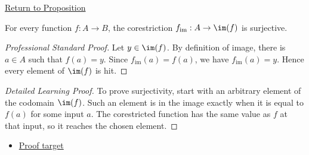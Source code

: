 \newpage
{}
\label{prf:corestriction-surjective}

\begin{remark*}[Return]
\hyperref[prop:corestriction-surjective]{Return to Proposition}
\end{remark*}

\begin{proposition*}
For every function $f:A\to B$, the corestriction
$f_{\operatorname{im}}:A\to\im(f)$ is surjective.
\end{proposition*}

\begin{proof}[Professional Standard Proof]
\LRAProofBodyStart
Let $y\in\im(f)$. By definition of image, there is $a\in A$ such that
$f(a)=y$. Since $f_{\operatorname{im}}(a)=f(a)$, we have
$f_{\operatorname{im}}(a)=y$. Hence every element of $\im(f)$ is hit.
\end{proof}

\begin{proof}[Detailed Learning Proof]
\LRAProofBodyStart
To prove surjectivity, start with an arbitrary element of the codomain
$\im(f)$. Such an element is in the image exactly when it is equal to $f(a)$
for some input $a$. The corestricted function has the same value as $f$ at
that input, so it reaches the chosen element.
\end{proof}
\begin{remark*}
\end{remark*}



\begin{dependencies}
\begin{itemize}
  \item \hyperref[prop:corestriction-surjective]{Proof target}
\end{itemize}
\end{dependencies}

\clearpage

